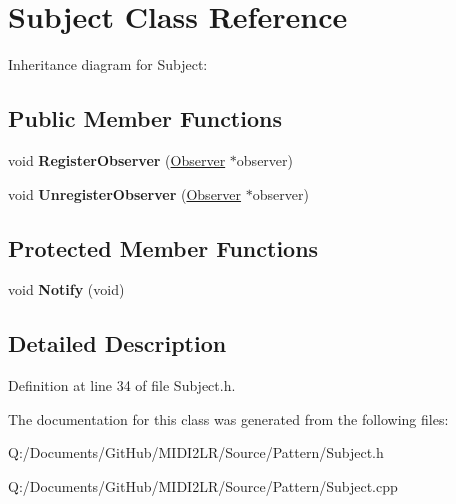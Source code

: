 \hypertarget{class_subject}{}\section{Subject Class Reference}
\label{class_subject}


Inheritance diagram for Subject\+:
\subsection*{Public Member Functions}
\begin{DoxyCompactItemize}
\item 
void {\bfseries Register\+Observer} (\hyperlink{class_observer}{Observer} $\ast$observer)\hypertarget{class_subject_ae4254eab0892ed61dae71e01a394ded6}{}\label{class_subject_ae4254eab0892ed61dae71e01a394ded6}

\item 
void {\bfseries Unregister\+Observer} (\hyperlink{class_observer}{Observer} $\ast$observer)\hypertarget{class_subject_a7106918d1c2b9a7e274bf2bd2004bbfb}{}\label{class_subject_a7106918d1c2b9a7e274bf2bd2004bbfb}

\end{DoxyCompactItemize}
\subsection*{Protected Member Functions}
\begin{DoxyCompactItemize}
\item 
void {\bfseries Notify} (void)\hypertarget{class_subject_ac8d74b2a80e2d4caa0a9a59e00a45219}{}\label{class_subject_ac8d74b2a80e2d4caa0a9a59e00a45219}

\end{DoxyCompactItemize}


\subsection{Detailed Description}


Definition at line 34 of file Subject.\+h.



The documentation for this class was generated from the following files\+:\begin{DoxyCompactItemize}
\item 
Q\+:/\+Documents/\+Git\+Hub/\+M\+I\+D\+I2\+L\+R/\+Source/\+Pattern/Subject.\+h\item 
Q\+:/\+Documents/\+Git\+Hub/\+M\+I\+D\+I2\+L\+R/\+Source/\+Pattern/Subject.\+cpp\end{DoxyCompactItemize}
